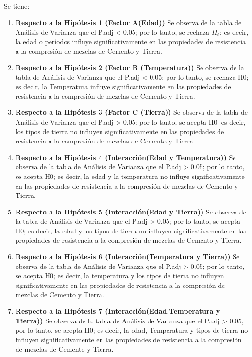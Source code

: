 \documentclass[12pt,letterpaper]{report}
\begin{document}
Se tiene:
\begin{enumerate}

\item {\textbf{Respecto a la Hipótesis 1 (Factor A(Edad))}}
Se observa de la tabla de Análisis de Varianza que el P.adj < 0.05; por lo tanto,
se rechaza $H_0$; es decir, la edad o períodos influye significativamente en las propiedades de
resistencia a la compresión de mezclas de Cemento y Tierra.

\item {\textbf{Respecto a la Hipótesis 2 (Factor B (Temperatura))}}
Se observa de la tabla de Análisis de Varianza que el P.adj < 0.05; por lo tanto,
se rechaza H0; es decir, la Temperatura influye significativamente en las propiedades de
resistencia a la compresión de mezclas de Cemento y Tierra.

\item {\textbf{Respecto a la Hipótesis 3 (Factor C (Tierra))}}
Se observa de la tabla de Análisis de Varianza que el P.adj > 0.05; por lo tanto, se
acepta H0; es decir, los tipos de tierra no influyen significativamente en las propiedades de
resistencia a la compresión de mezclas de Cemento y Tierra.

\item {\textbf{Respecto a la Hipótesis 4 (Interacción(Edad y Temperatura))}}
Se observa de la tabla de Análisis de Varianza que el P.adj > 0.05; por lo tanto, se
acepta H0; es decir, la edad y la temperatura no influye significativamente en las propiedades
de resistencia a la compresión de mezclas de Cemento y Tierra.

\item {\textbf{Respecto a la Hipótesis 5 (Interacción(Edad y Tierra))}}
Se observa de la tabla de Análisis de Varianza que el P.adj > 0.05; por lo tanto, se
acepta H0; es decir, la edad y los tipos de tierra no influyen significativamente en las
propiedades de resistencia a la compresión de mezclas de Cemento y Tierra.

\item {\textbf{Respecto a la Hipótesis 6 (Interacción(Temperatura y Tierra))}}
Se observa de la tabla de Análisis de Varianza que el P.adj > 0.05; por lo tanto, se
acepta H0; es decir, la temperatura y los tipos de tierra no influyen significativamente en las
propiedades de resistencia a la compresión de mezclas de Cemento y Tierra.

\item {\textbf{Respecto a la Hipótesis 7 (Interacción(Edad,Temperatura y Tierra))}}
Se observa de la tabla de Análisis de Varianza que el P.adj > 0.05; por lo tanto, se
acepta H0; es decir, la edad, Temperatura y tipos de tierra no influyen significativamente en
las propiedades de resistencia a la compresión de mezclas de Cemento y Tierra.

\end{enumerate}
\end{document}
